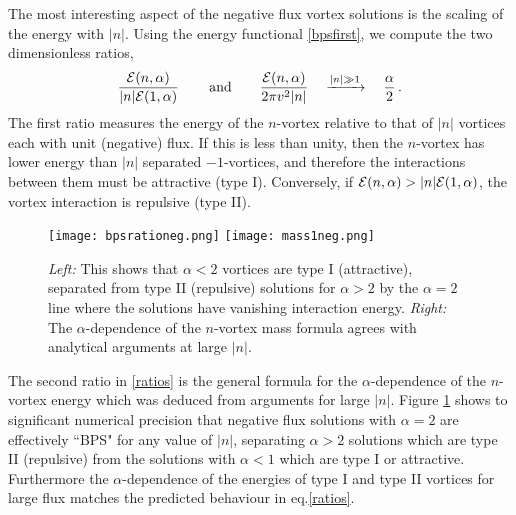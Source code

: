 \documentclass[12pt,a4paper]{article}
\def\be{\begin{equation}}
\def\ee{\end{equation}}
\begin{document}
The most interesting aspect of the negative flux vortex solutions is the scaling of the energy with $|n|$. Using the energy functional \eqref{bpsfirst}, we compute the two dimensionless ratios,
\be
\frac{{\cal E}(n, \alpha)}{{|n|\cal E}(1, \alpha)}\,\qquad{\rm and} \qquad \frac{{\cal E}(n, \alpha)}{2\pi v^2|n|} \quad\xrightarrow{|n|\gg 1} \quad\frac{\alpha}{2}\,.\label{ratios}
\ee
The first ratio measures the energy of the $n$-vortex relative to that of $|n|$ vortices each with unit (negative) flux. If this is less than unity, then the $n$-vortex has lower energy than $|n|$ separated $-1$-vortices, and therefore the interactions between them must be attractive (type I). Conversely, if ${\cal E}(n, \alpha) > |n|{\cal E}(1, \alpha)$, the vortex interaction is repulsive (type II). 
\begin{figure}[h]
\begin{center}
 \texttt{[image: bpsrationeg.png]}\hspace{0.1in}
    \texttt{[image: mass1neg.png]}
   \caption{{\small{\it Left:} This shows that $\alpha < 2$ vortices are type I (attractive), separated from type II (repulsive) solutions for $\alpha>2$ by the $\alpha=2$ line where the solutions have vanishing interaction energy. {\it Right:} The $\alpha$-dependence of the $n$-vortex mass formula agrees with analytical arguments at large $|n|$. }} \label{fig:massn1}
   \end{center}
\end{figure}
The second ratio in \eqref{ratios} is the general formula for the $\alpha$-dependence of the $n$-vortex energy which was deduced from arguments for large $|n|$. Figure \ref{fig:massn1} shows to significant numerical precision that negative flux solutions with $\alpha=2$ are effectively ``BPS" for any value of  $|n|$, separating $\alpha> 2$ solutions which are type II (repulsive) from the solutions with $\alpha < 1$ which are type I or attractive. Furthermore the $\alpha$-dependence of the energies of type I and type II vortices for large flux matches the predicted behaviour in eq.\eqref{ratios}. 
\end{document}
